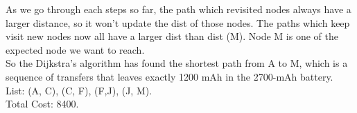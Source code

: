 \documentclass[12pt]{article}
\begin{document}
\begin{enumerate}
\begin{enumerate}
As we go through each steps so far, the path which revisited nodes always have a larger distance, so it won't update the dist of those nodes. The paths which keep visit new nodes now all have a larger dist than dist (M). Node M is one of the expected node we want to reach.\\
So the Dijkstra's algorithm has found the shortest path from A to M, which is a sequence of transfers that leaves exactly 1200 mAh in the 2700-mAh battery.\\
List: (A, C), (C, F), (F,J), (J, M).\\
Total Cost: 8400.\\
	\end{enumerate}


\end{enumerate}
\end{document}
